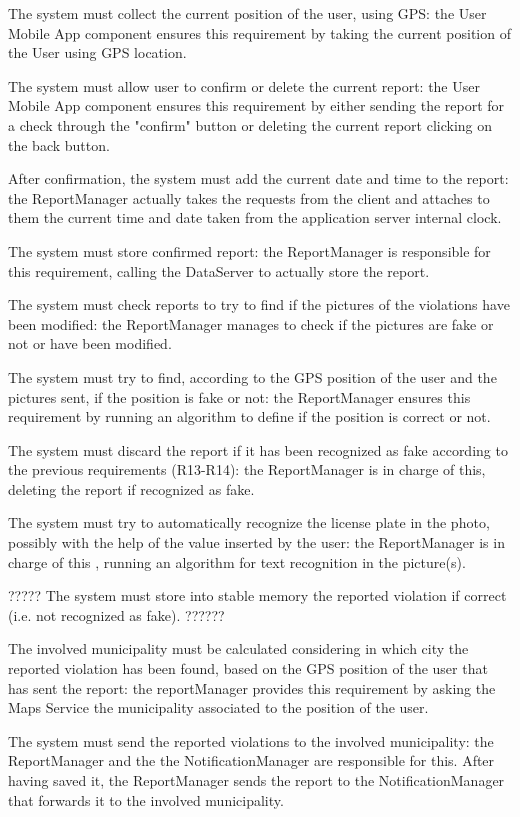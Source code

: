 \documentclass[a4paper]{report}
\begin{document}
\begin{enumerate}[start=1,label={[R\arabic*]}]
\item The system must collect the current position of the user, using GPS: the User Mobile App component ensures this requirement by taking the current position of the User using GPS location.
\item The system must allow user to confirm or delete the current report: the User Mobile App component ensures this requirement by either sending the report for a check through the "confirm" button or deleting the current report clicking on the back button.
\item After confirmation, the system must add the current date and time to the report: the ReportManager actually takes the requests from the client and attaches to them the current time and date taken from the application server internal clock.
\item The system must store confirmed report: the ReportManager is responsible for this requirement, calling the DataServer to actually store the report.
\item The system must check reports to try to find if the pictures of the violations have been modified: the ReportManager manages to check if the pictures are fake or not or have been modified.
\item The system must try to find, according to the GPS position of the user and the pictures sent, if the position is fake or not: the ReportManager ensures this requirement by running an algorithm to define if the position is correct or not. 
\item The system must discard the report if it has been recognized as fake according to the previous requirements (R13-R14): the ReportManager is in charge of this, deleting the report if recognized as fake.
\item The system must try to automatically recognize the license plate in the photo, possibly with the help of the value inserted by the user: the ReportManager is in charge of this , running an algorithm for text recognition in the picture(s).
\item ????? The system must store into stable memory the reported violation if correct (i.e. not recognized as fake). ??????
\item The involved municipality must be calculated considering in which city the reported violation has been found, based on the GPS position of the user that has sent the report: the reportManager provides this requirement by asking the Maps Service the municipality associated to the position of the user.
\item The system must send the reported violations to the involved municipality: the ReportManager and the the NotificationManager are responsible for this. After having saved it, the ReportManager sends the report to the NotificationManager that forwards it to the involved municipality.

\end{enumerate}
\end{document}

